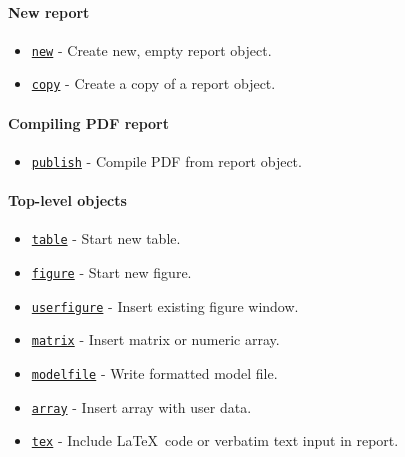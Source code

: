 

	\paragraph{New report}\label{new-report}

\begin{itemize}
\itemsep1pt\parskip0pt
\item
  \href{report/new}{\texttt{new}} - Create new, empty report object.
\item
  \href{report/copy}{\texttt{copy}} - Create a copy of a report object.
\end{itemize}

\paragraph{Compiling PDF report}\label{compiling-pdf-report}

\begin{itemize}
\itemsep1pt\parskip0pt
\item
  \href{report/publish}{\texttt{publish}} - Compile PDF from report
  object.
\end{itemize}

\paragraph{Top-level objects}\label{top-level-objects}

\begin{itemize}
\itemsep1pt\parskip0pt
\item
  \href{report/table}{\texttt{table}} - Start new table.
\item
  \href{report/figure}{\texttt{figure}} - Start new figure.
\item
  \href{report/userfigure}{\texttt{userfigure}} - Insert existing figure
  window.
\item
  \href{report/matrix}{\texttt{matrix}} - Insert matrix or numeric
  array.
\item
  \href{report/modelfile}{\texttt{modelfile}} - Write formatted model
  file.
\item
  \href{report/array}{\texttt{array}} - Insert array with user data.
\item
  \href{report/tex}{\texttt{tex}} - Include \LaTeX~code or verbatim text
  input in report.
\end{itemize}

